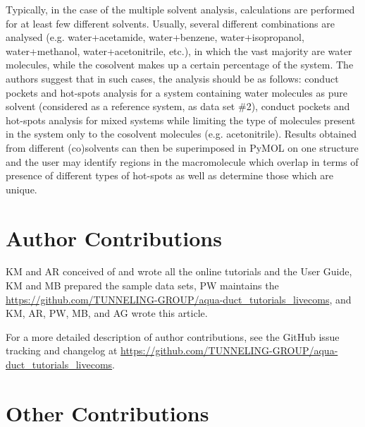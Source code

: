 \documentclass[9pt,tutorial]{livecoms}
\newcommand{\githubrepository}{\url{https://github.com/TUNNELING-GROUP/aqua-duct_tutorials_livecoms}}  %
\begin{document}
Typically, in the case of the multiple solvent analysis, calculations are performed for at least few different solvents. Usually, several different combinations are analysed (e.g. water+acetamide, water+benzene, water+isopropanol, water+methanol, water+acetonitrile, etc.), in which the vast majority are water molecules, while the cosolvent makes up a certain percentage of the system. The authors suggest that in such cases, the analysis should be as follows: conduct pockets and hot-spots analysis for a system containing water molecules as pure solvent (considered as a reference system, as data set \#2), conduct pockets and hot-spots analysis for mixed systems while limiting the type of molecules present in the system only to the cosolvent molecules (e.g. acetonitrile). Results obtained from different (co)solvents can then be superimposed in PyMOL on one structure and the user may identify regions in the macromolecule which overlap in terms of presence of different types of hot-spots as well as determine those which are unique.     

\section{Author Contributions}
%

KM and AR conceived of and wrote all the online tutorials and the User Guide, KM and MB prepared the sample data sets, PW maintains the \githubrepository, and KM, AR, PW, MB, and AG wrote this article.

For a more detailed description of author contributions,
see the GitHub issue tracking and changelog at \githubrepository.

\section{Other Contributions}
%
\end{document}

